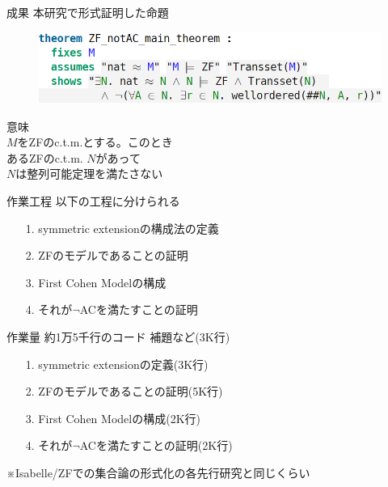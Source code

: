 \documentclass[17pt]{beamer}
\begin{document}
\begin{frame}{成果}
    本研究で形式証明した命題
    \begin{figure}
        \includegraphics[width=\linewidth]{./images/ZF_notAC_main_theorem.png} 
    \end{figure} 
    \vspace{-15pt}
    意味 \\
    {\small
    \hspace{1cm}$M$をZFのc.t.m.とする。このとき \\
    \vspace{4pt}\hspace{1cm}あるZFのc.t.m. $N$があって \\
    \hspace{1cm}$N$は整列可能定理を満たさない
    }
\end{frame}

\begin{frame}{作業工程}
    以下の工程に分けられる
    {\small
    \begin{itemize}[itemsep=8pt,left=0.5cm]
        \item [1.] symmetric extensionの構成法の定義
        \item [2.] ZFのモデルであることの証明
        \item [3.] First Cohen Modelの構成
        \item [4.] それが$\neg$ACを満たすことの証明
    \end{itemize}
    }
\end{frame}

\begin{frame}{作業量}
    約1万5千行のコード \hspace{0.6cm} {\small 補題など(3K行)}
    {\small
    \begin{itemize}[itemsep=8pt,left=0.5cm]
        \item [1.] symmetric extensionの定義(3K行)
        \item [2.] ZFのモデルであることの証明(5K行)
        \item [3.] First Cohen Modelの構成(2K行)
        \item [4.] それが$\neg$ACを満たすことの証明(2K行)
    \end{itemize} 

    ※Isabelle/ZFでの集合論の形式化の各先行研究と同じくらい
    }
\end{frame}
\end{document}
